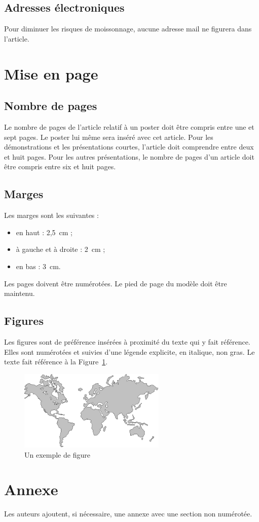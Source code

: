 \documentclass[11pt]{jres}
\begin{document}
\subsection{Adresses électroniques}

Pour diminuer les risques de moissonnage, aucune adresse mail ne
figurera dans l'article.

\section{Mise en page}

\subsection{Nombre de pages}

Le nombre de pages de l'article relatif à un poster doit être compris
entre une et sept pages. Le poster lui même sera inséré avec cet
article. Pour les démonstrations et les présentations courtes,
l'article doit comprendre entre deux et huit pages. Pour les autres
présentations, le nombre de pages d'un article doit être compris entre
six et huit pages.

\subsection{Marges}

Les marges sont les suivantes :

\begin{itemize}
\item en haut : 2,5\ cm ;
\item à gauche et à droite : 2\ cm ;
\item en bas : 3\ cm.
\end{itemize}

Les pages doivent être numérotées. Le pied de page du modèle doit être
maintenu.

\subsection{Figures}

Les figures sont de préférence insérées à proximité du texte qui y
fait référence. Elles sont numérotées et suivies d'une légende
explicite, en italique, non gras. Le texte fait référence à la 
Figure~\ref{fig-exemple}.

\begin{figure}
\centerline{\includegraphics[width=7cm]{figure}}
\caption{Un exemple de figure}
\label{fig-exemple}
\end{figure}


\section*{Annexe}

Les auteurs ajoutent, si nécessaire, une annexe avec une section non numérotée.

\nocite{*}

\end{document}
